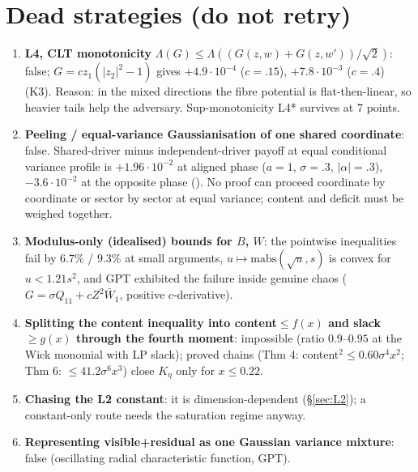 \documentclass[11pt,a4paper]{article}
\begin{document}
\section{Dead strategies (do not retry)}\label{sec:dead}
\begin{enumerate}
\item \textbf{L4, CLT monotonicity} $\Lambda(G)\le\Lambda((G(z,w)+G(z,w'))/\sqrt2)$: false; $G=cz_1(|z_2|^2-1)$ gives $+4.9\cdot10^{-4}$ ($c=.15$), $+7.8\cdot10^{-3}$ ($c=.4$) (K3). Reason: in
the mixed directions the fibre potential is flat-then-linear, so heavier tails help the adversary. Sup-monotonicity L4* survives at 7 points.
\item \textbf{Peeling / equal-variance Gaussianisation of one shared coordinate}: false. Shared-driver minus independent-driver payoff at equal conditional variance profile is
$+1.96\cdot10^{-2}$ at aligned phase ($a=1$, $\sigma=.3$, $|\alpha|=.3$), $-3.6\cdot10^{-2}$ at the opposite phase (). No proof can proceed coordinate by coordinate or sector by
sector at equal variance; content and deficit must be weighed together.
\item \textbf{Modulus-only (idealised) bounds for $B$, $W$}: the pointwise inequalities fail by $6.7\%$ / $9.3\%$ at small arguments, $u\mapsto\mathrm{mabs}(\sqrt u,s)$ is convex for $u<1.21s^2$,
and GPT exhibited the failure inside genuine chaos ($G=\sigma Q_{11}+cZ^2\bar W_1$, positive $c$-derivative).
\item \textbf{Splitting the content inequality into content$\le f(x)$ and slack$\ge g(x)$ through the fourth moment}: impossible (ratio $0.9$--$0.95$ at the Wick monomial with LP slack);
proved chains (Thm 4: content$^2\le0.60\sigma^4x^2$; Thm 6: $\le41.2\sigma^6x^3$) close $K_\eta$ only for $x\le0.22$.
\item \textbf{Chasing the L2 constant}: it is dimension-dependent (\S\ref{sec:L2}); a constant-only route needs the saturation regime anyway.
\item \textbf{Representing visible+residual as one Gaussian variance mixture}: false (oscillating radial characteristic function, GPT).
\end{enumerate}
\end{document}
